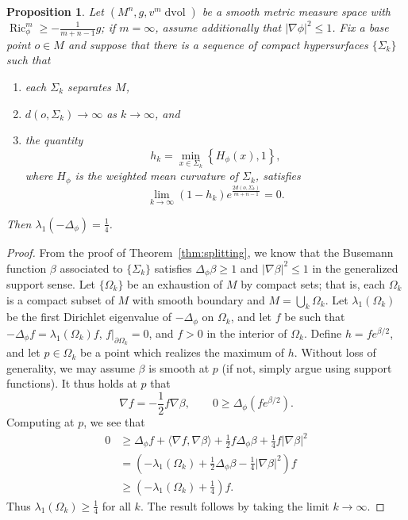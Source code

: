 \documentclass{amsart}
\newtheorem{prop}[thm]{Proposition}
\theoremstyle{definition}
\theoremstyle{remark}
\numberwithin{equation}{section}
\begin{document}
\begin{prop}
\label{prop:baby_lee}
Let $(M^n,g,v^m\operatorname{dvol})$ be a smooth metric measure space with $\operatorname{Ric}_\phi^m\geq -\frac{1}{m+n-1}g$; if $m=\infty$, assume additionally that ${\lvert}\nabla\phi{\rvert}^2\leq1$.  Fix a base point $o\in M$ and suppose that there is a sequence of compact hypersurfaces $\{\Sigma_k\}$ such that
\begin{enumerate}
\item each $\Sigma_k$ separates $M$,
\item $d(o,\Sigma_k)\to\infty$ as $k\to\infty$, and
\item the quantity
\[ h_k = \min_{x\in\Sigma_k}\left\{ H_\phi(x), 1\right\}, \]
where $H_\phi$ is the weighted mean curvature of $\Sigma_k$, satisfies
\[ \lim_{k\to\infty} (1-h_k)e^{\frac{2d(o,\Sigma_k)}{m+n-1}} = 0 . \]
\end{enumerate}
Then $\lambda_1(-\Delta_\phi)=\frac{1}{4}$.
\end{prop}

\begin{proof}

From the proof of Theorem~\ref{thm:splitting}, we know that the Busemann function $\beta$ associated to $\{\Sigma_k\}$ satisfies $\Delta_\phi\beta\geq 1$ and ${\lvert}\nabla\beta{\rvert}^2\leq 1$ in the generalized support sense.  Let $\{\Omega_k\}$ be an exhaustion of $M$ by compact sets; that is, each $\Omega_k$ is a compact subset of $M$ with smooth boundary and $M=\bigcup_k\Omega_k$.  Let $\lambda_1(\Omega_k)$ be the first Dirichlet eigenvalue of $-\Delta_\phi$ on $\Omega_k$, and let $f$ be such that $-\Delta_\phi f = \lambda_1(\Omega_k)f$, $f{\rvert}_{\partial\Omega_k}=0$, and $f>0$ in the interior of $\Omega_k$.  Define $h=fe^{\beta/2}$, and let $p\in\Omega_k$ be a point which realizes the maximum of $h$.  Without loss of generality, we may assume $\beta$ is smooth at $p$ (if not, simply argue using support functions).  It thus holds at $p$ that
\[ \nabla f = -\frac{1}{2}f\nabla\beta, \qquad 0 \geq \Delta_\phi\left(f e^{\beta/2}\right) . \]
Computing at $p$, we see that
\begin{align*}
0 & \geq \Delta_\phi f + {\langle}\nabla f,\nabla\beta{\rangle} + \frac{1}{2}f\Delta_\phi\beta + \frac{1}{4}f{\lvert}\nabla\beta{\rvert}^2 \\
& = \left(-\lambda_1(\Omega_k) + \frac{1}{2}\Delta_\phi\beta - \frac{1}{4}{\lvert}\nabla\beta{\rvert}^2\right) f \\
& \geq \left(-\lambda_1(\Omega_k) + \frac{1}{4}\right)f .
\end{align*}
Thus $\lambda_1(\Omega_k)\geq\frac{1}{4}$ for all $k$.  The result follows by taking the limit $k\to\infty$.
\end{proof}
\end{document}
